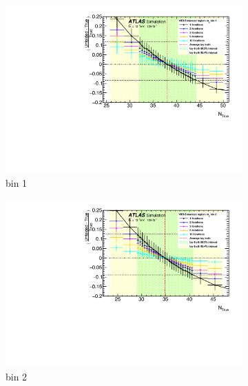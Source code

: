 \begin{itemize}
{    \begin{figure}[!htb]
        \centering
        \begin{subfigure}{.48\textwidth}
            \centering
            \includegraphics[width=.9\linewidth]{figures/Analysis/Unfolding/unfoldingbias/unfolding_bias_mjj_VBSEnh_bin1.pdf}
            \caption{ bin 1}
        \end{subfigure}
        \begin{subfigure}{.48\textwidth}
            \centering
            \includegraphics[width=.9\linewidth]{figures/Analysis/Unfolding/unfoldingbias/unfolding_bias_mjj_VBSEnh_bin2.pdf}
            \caption{bin 2 }
        \end{subfigure}\\
        \begin{subfigure}{.48\textwidth}
            \centering

\end{subfigure}
\end{figure}}
\end{itemize}
